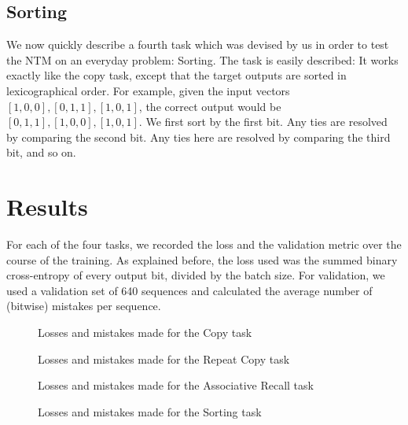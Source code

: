 \documentclass[12pt,twoside]{article}
\newcommand{\taskFigure}[1]{{\centering{
\makebox[\textwidth][c]{\texttt{[image: \#1]}}
}}}
\theoremstyle{plain}
\theoremstyle{definition}
\theoremstyle{remark}
\begin{document}
\subsection{Sorting}
We now quickly describe a fourth task which was devised by us in order to test the NTM on an everyday problem: Sorting. The task is easily described: It works exactly like the copy task, except that the target outputs are sorted in lexicographical order. For example, given the input vectors $[1, 0, 0], [0, 1, 1], [1, 0, 1]$, the correct output would be $[0, 1, 1], [1, 0, 0],  [1, 0, 1]$. We first sort by the first bit. Any ties are resolved by comparing the second bit. Any ties here are resolved by comparing the third bit, and so on.

\section{Results}
For each of the four tasks, we recorded the loss and the validation metric over the course of the training. As explained before, the loss used was the summed binary cross-entropy of every output bit, divided by the batch size. For validation, we used a validation set of 640 sequences and calculated the average number of (bitwise) mistakes per sequence.

\begin{figure}\label{fig-copy}
\taskFigure{../figures/copy_task.pdf}
 \caption{Losses and mistakes made for the Copy task}
\end{figure}

\begin{figure}\label{fig-repeat-copy}
\taskFigure{../figures/repeat_copy_task.pdf}
\caption{Losses and mistakes made for the Repeat Copy task}
\end{figure}

\begin{figure}\label{fig-assoc}
\taskFigure{../figures/associative_recall_task.pdf}
\caption{Losses and mistakes made for the Associative Recall task}
\end{figure}

\begin{figure}\label{fig-sort}
\taskFigure{../figures/sorting_task.pdf}
\caption{Losses and mistakes made for the Sorting task}
\end{figure}
\end{document}

